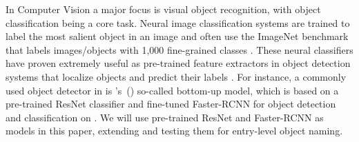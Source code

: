  


In Computer Vision a major focus is visual object recognition, with object classification being a core task. 
Neural image classification systems are trained to label the most salient object in an image and often use the ImageNet \cite{imagenet_cvpr09} benchmark that labels images/objects with 1,000 fine-grained classes \cite{googlenet,he2016deep}. 
These neural classifiers have proven extremely useful %
as pre-trained feature extractors in object detection systems that localize objects and predict their labels \cite{fasterrcnn2015}.
For instance, a commonly used object detector in \lv is \citeauthor{anderson2018updown}'s~(\citeyear{anderson2018updown}) so-called bottom-up model, which is based on a pre-trained ResNet classifier and fine-tuned Faster-RCNN \cite{fasterrcnn2015} for object detection and classification on \vg. 
We will use pre-trained ResNet and Faster-RCNN as models in this paper, extending and testing them for entry-level object naming. 

